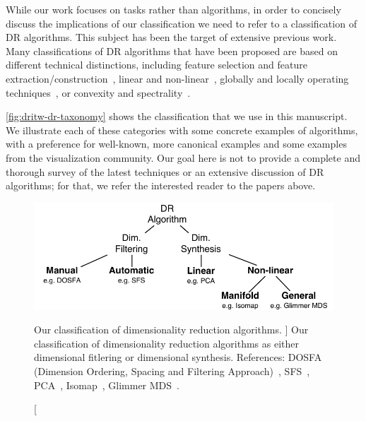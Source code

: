 While our work focuses on tasks rather than algorithms, in order to concisely discuss the implications of our classification we need to refer to a classification of \ac{DR} algorithms. 
This subject has been the target of extensive previous work. Many classifications of \ac{DR} algorithms that have been proposed are based on different technical distinctions, including feature selection and feature extraction/construction~\cite{Cunningham2008,Guyon2003,Jain2000,Witten2011}, linear and non-linear~\cite{Jain2000}, globally and locally operating techniques~\cite{France2011}, or convexity and spectrality~\cite{VanderMaaten2009}. 

\autoref{fig:dritw-dr-taxonomy} shows the classification that we use in this manuscript. 
We illustrate each of these categories with some concrete examples of algorithms, with a preference for well-known, more canonical examples and some examples from the visualization community. 
Our goal here is not to provide a complete and thorough survey of the latest techniques or an extensive discussion of \ac{DR} algorithms; for that, we refer the interested reader to the papers above.


\begin{figure}
    \centering
    \includegraphics[width=\textwidth]{figures/dritw-dr-taxonomy}
    \caption
    [
        Our classification of dimensionality reduction algorithms.
    ]
    {
        Our classification of dimensionality reduction algorithms as either dimensional fitlering or dimensional synthesis. References: DOSFA (Dimension Ordering, Spacing and Filtering Approach)~\cite{Yang2003}, \ac{SFS}~\cite{Jain2000}, \ac{PCA}~\cite{Jolliffe2002}, Isomap~\cite{Tenenbaum2000}, Glimmer \ac{MDS}~\cite{Ingram2009}.
    }
    \label{fig:dritw-dr-taxonomy}
    \centering
\end{figure}

